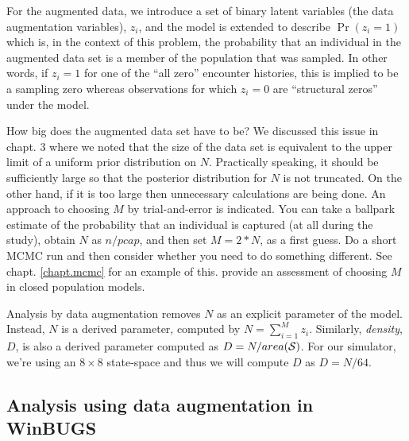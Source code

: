 For the augmented data, we introduce a set of binary latent variables
(the data augmentation variables), $z_{i}$, and the model is extended
to describe $\Pr(z_{i} = 1)$ which is, in the context of this problem,
the probability that an individual in the augmented data set is a
member of the population that was sampled. In other words, if $z_{i}=1$
for one of the ``all zero'' encounter histories, this is implied to be
a sampling zero whereas observations for which $z_{i}=0$ are
``structural zeros'' under the model.

How big does the augmented data set have to be? We discussed this
issue in chapt. 3 where we noted that the size of the data set is
equivalent to the upper limit of a uniform prior distribution on $N$.
Practically speaking, it should be sufficiently large so that the
posterior distribution for $N$ is not truncated. On the other hand, if
it is too large then unnecessary calculations are being done. An
approach to choosing $M$ by trial-and-error is indicated. You can take
a ballpark estimate of the probability that an individual is captured
(at all during the study), obtain $N$ as $n/pcap$, and then set $M =
2*N$, as a first guess. Do a short MCMC run and then consider whether
you need to do something different. See chapt. \ref{chapt.mcmc} for an
example of this. \citet[][ch. 6]{kery_schaub:2011}
 provide an assessment of choosing $M$ in closed population models.

Analysis by data augmentation removes $N$ as an explicit parameter of
the model. Instead, $N$ is a derived parameter, computed by $N=
\sum_{i=1}^{M} z_{i}$. Similarly, {\it density}, $D$, is also a
derived parameter computed as $D=N/area({\cal S})$. For our
simulator, we're using an $8 \times 8$ state-space and thus we will
compute $D$ as $D=N/64$.

\subsection{Analysis using data augmentation in WinBUGS}

